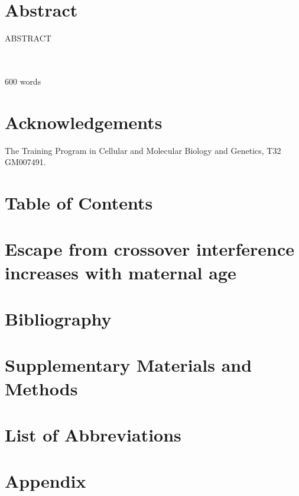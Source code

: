 \documentclass[11pt]{report}
\begin{document}
\clearpage
\chapter*{Abstract}
\begin{center}
ABSTRACT
\end{center}
\Title \\
\Author \\
600 words

\clearpage
\chapter*{Acknowledgements}
The Training Program in Cellular and Molecular Biology and Genetics, T32 GM007491.

\clearpage
\chapter*{Table of Contents}
\tableofcontents
\listoffigures
\listoftables


\chapter{Escape from crossover interference increases with maternal age}

\setcounter{page}{1}

\clearpage
\chapter*{Bibliography}

\clearpage
\chapter*{Supplementary Materials and Methods}

\clearpage
\chapter*{List of Abbreviations}

\clearpage
\chapter*{Appendix}

\end{document}
